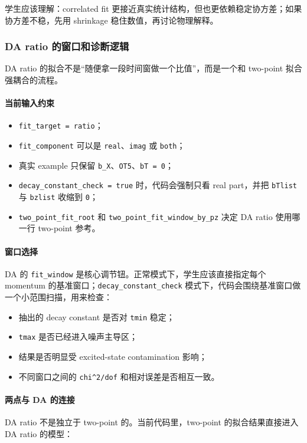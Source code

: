 \documentclass[11pt,a4paper,fontset=fandol]{ctexart}
\begin{document}
学生应该理解：correlated fit 更接近真实统计结构，但也更依赖稳定协方差；如果协方差不稳，先用 shrinkage 稳住数值，再讨论物理解释。

\subsubsection{DA ratio 的窗口和诊断逻辑}

DA ratio 的拟合不是“随便拿一段时间窗做一个比值”，而是一个和 two-point 拟合强耦合的流程。

\paragraph{当前输入约束}
\begin{itemize}[leftmargin=2em]
  \item \lstinline|fit_target = ratio|；
  \item \lstinline|fit_component| 可以是 \lstinline|real|、\lstinline|imag| 或 \lstinline|both|；
  \item 真实 example 只保留 \lstinline|b_X|、\lstinline|OT5|、\lstinline|bT = 0|；
  \item \lstinline|decay_constant_check = true| 时，代码会强制只看 real part，并把 \lstinline|bTlist| 与 \lstinline|bzlist| 收缩到 \lstinline|0|；
  \item \lstinline|two_point_fit_root| 和 \lstinline|two_point_fit_window_by_pz| 决定 DA ratio 使用哪一行 two-point 参考。
\end{itemize}

\paragraph{窗口选择}
DA 的 \lstinline|fit_window| 是核心调节钮。正常模式下，学生应该直接指定每个 momentum 的基准窗口；\lstinline|decay_constant_check| 模式下，代码会围绕基准窗口做一个小范围扫描，用来检查：

\begin{itemize}[leftmargin=2em]
  \item 抽出的 decay constant 是否对 \lstinline|tmin| 稳定；
  \item \lstinline|tmax| 是否已经进入噪声主导区；
  \item 结果是否明显受 excited-state contamination 影响；
  \item 不同窗口之间的 \lstinline|chi^2/dof| 和相对误差是否相互一致。
\end{itemize}

\paragraph{两点与 DA 的连接}
DA ratio 不是独立于 two-point 的。当前代码里，two-point 的拟合结果直接进入 DA ratio 的模型：
\end{document}
